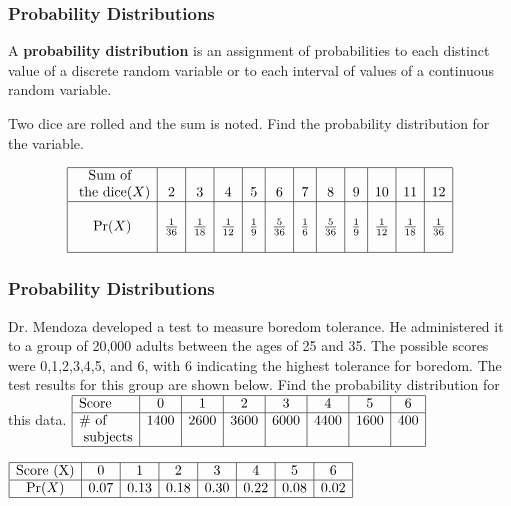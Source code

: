 \documentclass[Lecture.tex]{subfiles}
\begin{document}
\begin{frame}
\frametitle{Probability Distributions}\pause
\begin{definition}
A \textbf{probability distribution} is an assignment of probabilities to each distinct value of a discrete random variable or to each interval of values of a continuous random variable.
\end{definition}\pause
\begin{example}
Two dice are rolled and the sum is noted.  Find the probability distribution for the variable.
\end{example}\pause
$$\begin{array}{|c|c|c|c|c|c|c|c|c|c|c|c|}
\hline
\text{Sum of }&&&&&&&&&&&\\
\text{ the dice}(X)&2 &3 &4 &5 &6 &7 &8 &9 &10 &11 &12\\
\hline
&&&&&&&&&&&\\
\Pr(X)&\frac{1}{36}&\frac{1}{18}&\frac{1}{12}&\frac{1}{9}&\frac{5}{36}&\frac{1}{6}&\frac{5}{36}&\frac{1}{9}&\frac{1}{12}&\frac{1}{18}&\frac{1}{36}\\
&&&&&&&&&&&\\
\hline
\end{array}$$
\end{frame}

\begin{frame}
\frametitle{Probability Distributions}\pause
\begin{example}
Dr. Mendoza developed a test to measure boredom tolerance.  He administered it to a group of 20,000 adults between the ages of 25 and 35.  The possible scores were 0,1,2,3,4,5, and 6, with 6 indicating the highest tolerance for boredom.  The test results for this group are shown below.  Find the probability distribution for this data.
$\begin{array}{|l|c|c|c|c|c|c|c|}
\hline
\text{Score}&0&1&2&3&4&5&6\\
\hline
\text{\# of }&1400&2600&3600&6000&4400&1600&400\\
\text{ subjects} & & & & & & &\\
\hline
\end{array}$
\end{example}\pause
$\begin{array}{|c|c|c|c|c|c|c|c|}
\hline
\text{Score (X)}&0&1&2&3&4&5&6\\
\hline
\Pr(X)&0.07&0.13&0.18&0.30&0.22&0.08&0.02\\
\hline
\end{array}$
\end{frame}
\end{document}
